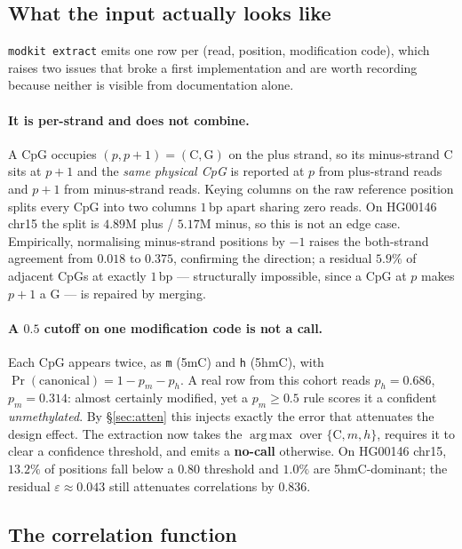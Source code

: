 \documentclass[11pt]{article}
\DeclareMathOperator*{\argmax}{arg\,max}
\begin{document}
\subsection{What the input actually looks like}

\texttt{modkit extract} emits one row per (read, position, modification code),
which raises two issues that broke a first implementation and are worth
recording because neither is visible from documentation alone.

\paragraph{It is per-strand and does not combine.} A CpG occupies
$(p, p+1) = (\mathrm{C}, \mathrm{G})$ on the plus strand, so its minus-strand C
sits at $p+1$ and the \emph{same physical CpG} is reported at $p$ from
plus-strand reads and $p+1$ from minus-strand reads. Keying columns on the raw
reference position splits every CpG into two columns $1$\,bp apart sharing zero
reads. On HG00146 chr15 the split is $4.89$M plus / $5.17$M minus, so this is not
an edge case. Empirically, normalising minus-strand positions by $-1$ raises the
both-strand agreement from $0.018$ to $0.375$, confirming the direction; a
residual $5.9\%$ of adjacent CpGs at exactly $1$\,bp --- structurally impossible,
since a CpG at $p$ makes $p+1$ a G --- is repaired by merging.

\paragraph{A $0.5$ cutoff on one modification code is not a call.} Each CpG
appears twice, as \texttt{m} (5mC) and \texttt{h} (5hmC), with
$\Pr(\text{canonical}) = 1 - p_m - p_h$. A real row from this cohort reads
$p_h = 0.686$, $p_m = 0.314$: almost certainly modified, yet a
$p_m \ge 0.5$ rule scores it a confident \emph{unmethylated}. By
\S\ref{sec:atten} this injects exactly the error that attenuates the design
effect. The extraction now takes the $\argmax$ over $\{\mathrm{C}, m, h\}$,
requires it to clear a confidence threshold, and emits a \textbf{no-call}
otherwise. On HG00146 chr15, $13.2\%$ of positions fall below a $0.80$ threshold
and $1.0\%$ are 5hmC-dominant; the residual $\varepsilon \approx 0.043$ still
attenuates correlations by $0.836$.

\subsection{The correlation function}
\end{document}
